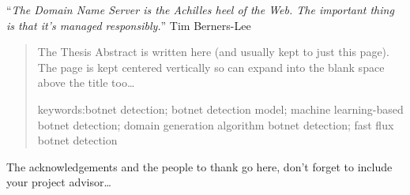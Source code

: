 \documentclass[
11pt, %
english, %
singlespacing, %
headsepline, %
]{MastersDoctoralThesis} %
\begin{document}
\newpage

\vspace*{0.2\textheight}

\noindent\enquote{\itshape The Domain Name Server is the Achilles heel of the Web. The important thing is that it's managed responsibly.}\bigbreak
\hfill Tim Berners-Lee


\begin{abstract}
\addchaptertocentry{\abstractname} %
The Thesis Abstract is written here (and usually kept to just this page). The page is kept centered vertically so can expand into the blank space above the title too\ldots

keywords:botnet detection; botnet detection model; machine learning-based botnet detection;\cite{ref1}
domain generation algorithm botnet detection; fast flux botnet detection
\end{abstract}


\begin{acknowledgements}
\addchaptertocentry{\acknowledgementname} %
The acknowledgements and the people to thank go here, don't forget to include your project advisor\ldots
\end{acknowledgements}


\tableofcontents %

\listoffigures %

\listoftables %

\end{document}
